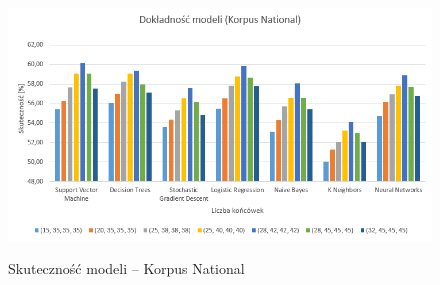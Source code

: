 \begin{figure}[!htbp]
	\centering
	\includegraphics[width=\linewidth]{korpusnationalwykres}
	\label{Rysunek}
	\caption{Skuteczność modeli -- Korpus National}
\end{figure}

